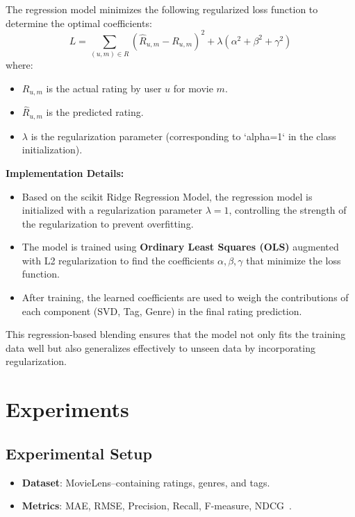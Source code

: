 \documentclass[nonacm, sigconf]{acmart}
\begin{document}
The regression model minimizes the following regularized loss function to determine the optimal coefficients:
\begin{equation}
L = \sum_{(u,m) \in R} (\hat{R}_{u,m} - R_{u,m})^2 + \lambda \left( \alpha^2 + \beta^2 + \gamma^2 \right)
\end{equation}
where:
\begin{itemize}
    \item $R_{u,m}$ is the actual rating by user $u$ for movie $m$.
    \item $\hat{R}_{u,m}$ is the predicted rating.
    \item $\lambda$ is the regularization parameter (corresponding to `alpha=1` in the class initialization).
\end{itemize}

\textbf{Implementation Details:}
\begin{itemize}
    \item Based on the scikit Ridge Regression Model, the regression model is initialized with a regularization parameter $\lambda = 1$, controlling the strength of the regularization to prevent overfitting.
    \item The model is trained using \textbf{Ordinary Least Squares (OLS)} augmented with L2 regularization to find the coefficients $\alpha, \beta, \gamma$ that minimize the loss function.
    \item After training, the learned coefficients are used to weigh the contributions of each component (SVD, Tag, Genre) in the final rating prediction.
\end{itemize}

This regression-based blending ensures that the model not only fits the training data well but also generalizes effectively to unseen data by incorporating regularization.

\section{Experiments}
\subsection{Experimental Setup}
\begin{itemize}
    \item \textbf{Dataset}: MovieLens--containing ratings, genres, and tags.
    \item \textbf{Metrics}: MAE, RMSE, Precision, Recall, F-measure, NDCG~\cite{scikit_ndcg_github}.
\end{itemize}
\end{document}
